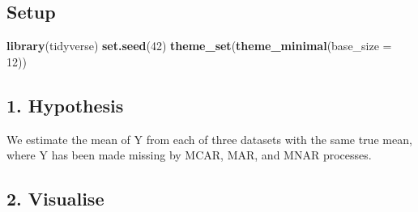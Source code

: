 \documentclass[
]{article}
\newenvironment{Shaded}{\begin{snugshade}}{\end{snugshade}}
\newcommand{\AttributeTok}[1]{\textcolor[rgb]{0.13,0.29,0.53}{#1}}
\newcommand{\DecValTok}[1]{\textcolor[rgb]{0.00,0.00,0.81}{#1}}
\newcommand{\FunctionTok}[1]{\textcolor[rgb]{0.13,0.29,0.53}{\textbf{#1}}}
\newcommand{\NormalTok}[1]{#1}
\begin{document}
\subsection{Setup}\label{setup}

\begin{Shaded}
\begin{Highlighting}[]
\FunctionTok{library}\NormalTok{(tidyverse)}
\FunctionTok{set.seed}\NormalTok{(}\DecValTok{42}\NormalTok{)}
\FunctionTok{theme\_set}\NormalTok{(}\FunctionTok{theme\_minimal}\NormalTok{(}\AttributeTok{base\_size =} \DecValTok{12}\NormalTok{))}
\end{Highlighting}
\end{Shaded}

\subsection{1. Hypothesis}\label{hypothesis}

We estimate the mean of Y from each of three datasets with the same true
mean, where Y has been made missing by MCAR, MAR, and MNAR processes.

\subsection{2. Visualise}\label{visualise}
\end{document}
